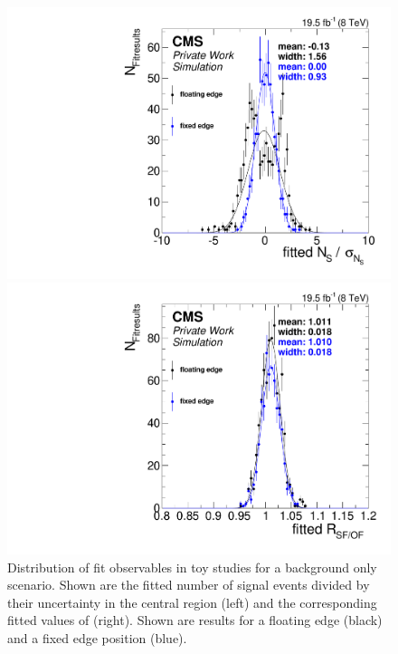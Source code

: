 \begin{figure}[hbp]
  \centering
  \begin{minipage}[t]{0.49\textwidth}
    \includegraphics[width=\textwidth]{plots/results/fit/nS_floatVsFixed.pdf}
  \end{minipage}
  \begin{minipage}[t]{0.49\textwidth}
    \includegraphics[width=\textwidth]{plots/results/fit/rSFOF_floatVsFixed.pdf}
  \end{minipage}

  \caption{Distribution of fit observables in toy studies for a background only scenario. Shown are the fitted number of signal events divided by their uncertainty in the central region (left) and the corresponding fitted values of \Rsfof (right). Shown are results for a floating edge (black) and a fixed edge position (blue).}
  \label{fig:toys:backgroundOnly}
\end{figure}

